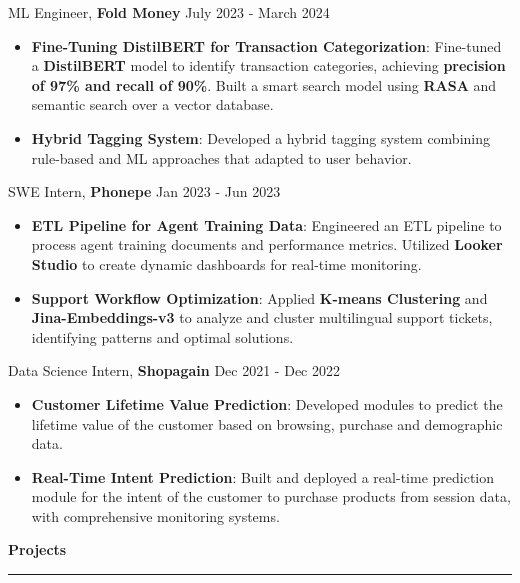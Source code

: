\documentclass{article}%
\begin{document}
\vspace{-1mm}
ML Engineer, \textbf {Fold Money} \hfill{July 2023 - March 2024}
\vspace{-1mm}
\begin{itemize}
\setlength\itemsep{0.01em}
\item \textbf{Fine-Tuning DistilBERT for Transaction Categorization}: Fine-tuned a \textbf{DistilBERT} model to identify transaction categories, achieving \textbf{precision of 97\% and recall of 90\%}. Built a smart search model using \textbf{RASA} and semantic search over a vector database.
\item \textbf{Hybrid Tagging System}: Developed a hybrid tagging system combining rule-based and ML approaches that adapted to user behavior.
    \hfill \href{https://fold.money/blog/automating-transaction-tagging}{\faGlobe}
\end{itemize}
\vspace{-1mm}
SWE Intern, \textbf {Phonepe} \hfill{Jan 2023 - Jun 2023}
\vspace{-1mm}
\begin{itemize}
\setlength\itemsep{0.01em}
\item \textbf{ETL Pipeline for Agent Training Data}: Engineered an ETL pipeline to process agent training documents and performance metrics. Utilized \textbf{Looker Studio} to create dynamic dashboards for real-time monitoring.
    \item \textbf{Support Workflow Optimization}: Applied \textbf{K-means Clustering} and \textbf{Jina-Embeddings-v3} to analyze and cluster multilingual support tickets, identifying patterns and optimal solutions.
\end{itemize}
\vspace{-1mm}
Data Science Intern, \textbf{Shopagain} \hfill{Dec 2021 - Dec 2022}
\vspace{-1mm}
\begin{itemize}
\setlength\itemsep{0.01em}
\item \textbf{Customer Lifetime Value Prediction}: Developed modules to predict the lifetime value of the customer based on browsing, purchase and demographic data.
    \item \textbf{Real-Time Intent Prediction}: Built and deployed a real-time prediction module for the intent of the customer to purchase products from session data, with comprehensive monitoring systems.
\end{itemize}

\pagebreak

\begin{flushleft}
\bf{\Large{Projects}}
\end{flushleft}
\vspace{-2mm}
\noindent\rule{\textwidth}{0.4pt}
\vspace{2mm}
\end{document}
